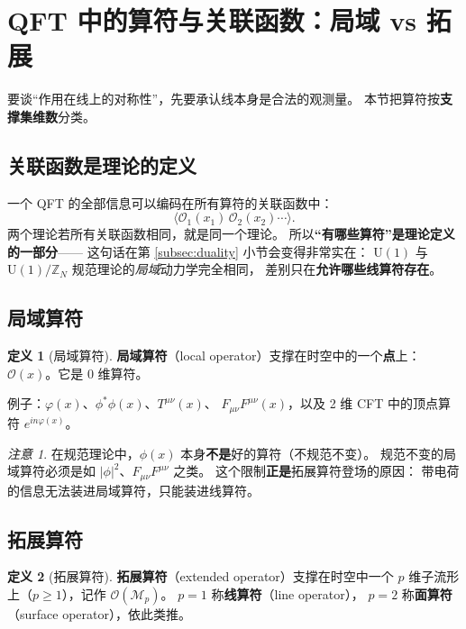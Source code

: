 \documentclass[UTF8,a4paper,11pt]{ctexart}
\theoremstyle{plain}
\theoremstyle{definition}
\newtheorem{definition}{定义}[section]
\theoremstyle{remark}
\newtheorem{warning}{注意}[section]
\newcommand{\ZZ}{\mathbb{Z}}
\newcommand{\Uone}{\mathrm{U}(1)}
\newcommand{\Op}{\mathcal{O}}
\newcommand{\Mfd}{\mathcal{M}}
\newcommand{\en}[1]{\textsf{#1}}       %
\begin{document}
\section{QFT 中的算符与关联函数：局域 vs 拓展}
\label{sec:operators}

要谈“作用在线上的对称性”，先要承认线本身是合法的观测量。
本节把算符按\textbf{支撑集维数}分类。

\subsection{关联函数是理论的定义}

一个 QFT 的全部信息可以编码在所有算符的关联函数中：
\begin{equation}
  \big\langle \Op_1(x_1)\,\Op_2(x_2)\cdots\big\rangle .
\end{equation}
两个理论若所有关联函数相同，就是同一个理论。
所以\textbf{“有哪些算符”是理论定义的一部分}——
这句话在第 \ref{subsec:duality} 小节会变得非常实在：
$\Uone$ 与 $\Uone/\ZZ_N$ 规范理论的\emph{局域}动力学完全相同，
差别只在\textbf{允许哪些线算符存在}。

\subsection{局域算符}

\begin{definition}[局域算符]
\textbf{局域算符}（\en{local operator}）支撑在时空中的一个\textbf{点}上：
$\Op(x)$。它是 $0$ 维算符。
\end{definition}

例子：$\varphi(x)$、$\phi^*\phi(x)$、$T^{\mu\nu}(x)$、
$F_{\mu\nu}F^{\mu\nu}(x)$，以及 2 维 CFT 中的顶点算符
$e^{i n\varphi(x)}$。

\begin{warning}
在规范理论中，$\phi(x)$ 本身\textbf{不是}好的算符（不规范不变）。
规范不变的局域算符必须是如 $|\phi|^2$、$F_{\mu\nu}F^{\mu\nu}$ 之类。
这个限制\textbf{正是}拓展算符登场的原因：
带电荷的信息无法装进局域算符，只能装进线算符。
\end{warning}

\subsection{拓展算符}
\label{subsec:extended}

\begin{definition}[拓展算符]
\textbf{拓展算符}（\en{extended operator}）支撑在时空中一个
$p$ 维子流形上（$p\ge1$），记作 $\Op(\Mfd_p)$。
$p=1$ 称\textbf{线算符}（\en{line operator}），
$p=2$ 称\textbf{面算符}（\en{surface operator}），依此类推。
\end{definition}
\end{document}
